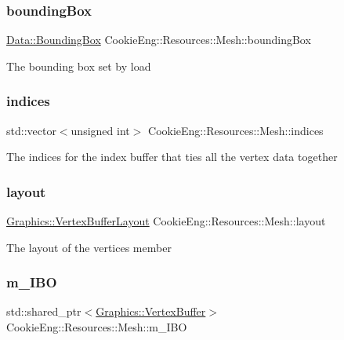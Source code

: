 \subsubsection{\texorpdfstring{bounding\+Box}{boundingBox}}
{\footnotesize\ttfamily \hyperlink{class_cookie_eng_1_1_data_1_1_bounding_box}{Data\+::\+Bounding\+Box} Cookie\+Eng\+::\+Resources\+::\+Mesh\+::bounding\+Box}

The bounding box set by load \mbox{\label{struct_cookie_eng_1_1_resources_1_1_mesh_a78ad4658bc848293472999b4708b85ab}} 
\subsubsection{\texorpdfstring{indices}{indices}}
{\footnotesize\ttfamily std\+::vector$<$unsigned int$>$ Cookie\+Eng\+::\+Resources\+::\+Mesh\+::indices}

The indices for the index buffer that ties all the vertex data together \mbox{\label{struct_cookie_eng_1_1_resources_1_1_mesh_a7d60f959cc5a9cadbc59299e207032f2}} 
\subsubsection{\texorpdfstring{layout}{layout}}
{\footnotesize\ttfamily \hyperlink{class_cookie_eng_1_1_graphics_1_1_vertex_buffer_layout}{Graphics\+::\+Vertex\+Buffer\+Layout} Cookie\+Eng\+::\+Resources\+::\+Mesh\+::layout}

The layout of the vertices member \mbox{\label{struct_cookie_eng_1_1_resources_1_1_mesh_aff20a2371d9413acc57ab5ff9086fa15}} 
\subsubsection{\texorpdfstring{m\+\_\+\+I\+BO}{m\_IBO}}
{\footnotesize\ttfamily std\+::shared\+\_\+ptr$<$\hyperlink{class_cookie_eng_1_1_graphics_1_1_vertex_buffer}{Graphics\+::\+Vertex\+Buffer}$>$ Cookie\+Eng\+::\+Resources\+::\+Mesh\+::m\+\_\+\+I\+BO\hspace{0.3cm}{\ttfamily [protected]}}

